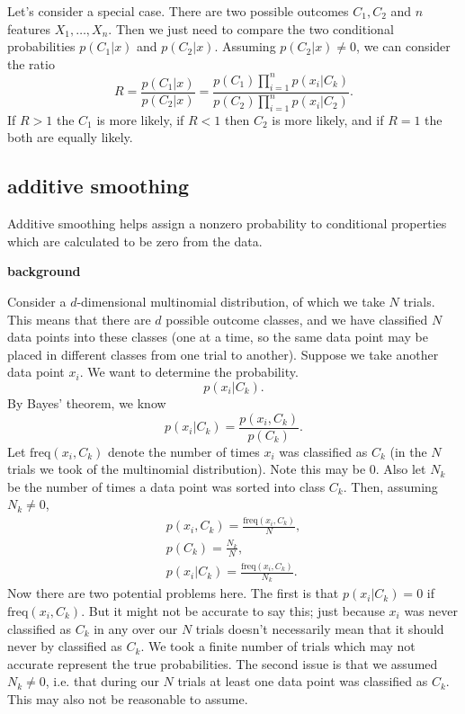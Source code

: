 \documentclass[12pt]{article}
\begin{document}
Let's consider a special case. There are two possible outcomes $C_1, C_2$ and $n$ features $X_1,\dots,X_n$. Then we just need to compare the two conditional probabilities $p(C_1|x)$ and $p(C_2|x)$. Assuming $p(C_2|x)\neq 0$, we can consider the ratio 
\begin{equation*}
	R=\frac{p(C_1|x)}{p(C_2|x)}=\frac{p(C_1)\prod_{i=1}^n p(x_i|C_k)}{p(C_2)\prod_{i=1}^n p(x_i|C_2)}.
\end{equation*}
If $R>1$ the $C_1$ is more likely, if $R<1$ then $C_2$ is more likely, and if $R=1$ the both are equally likely. 


\subsection{additive smoothing} %

Additive smoothing helps assign a nonzero probability to conditional properties which are calculated to be zero from the data.

\textbf{background} 

Consider a $d$-dimensional multinomial distribution, of which we take $N$ trials. This means that there are $d$ possible outcome classes, and we have classified $N$ data points into these classes (one at a time, so the same data point may be placed in different classes from one trial to another). Suppose we take another data point $x_i$. We want to determine the probability.
\begin{equation*}
	p(x_i | C_k).
\end{equation*}
By Bayes' theorem, we know 
\begin{equation*}
	p(x_i | C_k) = \frac{p(x_i,C_k)}{p(C_k)}.
\end{equation*}
Let $\text{freq}(x_i,C_k)$ denote the number of times $x_i$ was classified as $C_k$ (in the $N$ trials we took of the multinomial distribution). Note this may be 0. Also let $N_k$ be the number of times a data point was sorted into class $C_k$. Then, assuming $N_k\neq 0$, 
\begin{gather*}
	p(x_i,C_k) = \frac{\text{freq}(x_i,C_k)}{N}, \\
	p(C_k) = \frac{N_k}{N}, \\
	p(x_i | C_k) = \frac{\text{freq}(x_i,C_k)}{N_k}.
\end{gather*}
Now there are two potential problems here. The first is that $p(x_i|C_k)=0$ if $\text{freq}(x_i,C_k)$. But it might not be accurate to say this; just because $x_i$ was never classified as $C_k$ in any over our $N$ trials doesn't necessarily mean that it should never by classified as $C_k$. We took a finite number of trials which may not accurate represent the true probabilities. The second issue is that we assumed $N_k\neq 0$, i.e. that during our $N$ trials at least one data point was classified as $C_k$. This may also not be reasonable to assume.
\end{document}

